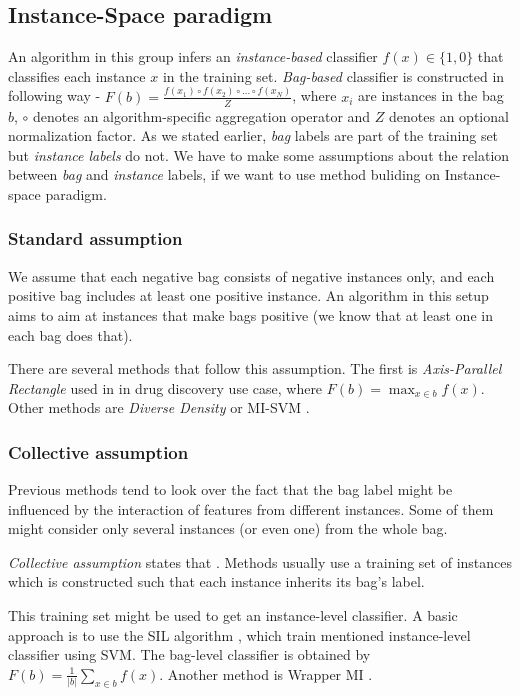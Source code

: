 \subsection{Instance-Space paradigm}
An algorithm in this group infers an \emph{instance-based} classifier $f(x) \in \{1,0\}$ that classifies each instance $x$ in the training set. \emph{Bag-based} classifier is constructed in following way - $F(b)=\frac{f(x_1)\circ f(x_2)\circ\dots\circ f(x_N)}{Z}$, where $x_i$ are instances in the bag $b$, $\circ$ denotes an algorithm-specific aggregation operator and $Z$ denotes an optional normalization factor. As we stated earlier, \emph{bag} labels are part of the training set but \emph{instance labels} do not. We have to make some assumptions about the relation between \emph{bag} and \emph{instance} labels, if we want to use method buliding on Instance-space paradigm.

\subsubsection{Standard assumption}
We assume that each negative bag consists of negative instances only, and each positive bag includes at least one positive instance. An algorithm in this setup aims to aim at instances that make bags positive (we know that at least one in each bag does that).

There are several methods that follow this assumption. The first is \emph{Axis-Parallel Rectangle} used in \cite{Dietterich1997} in drug discovery use case, where $F(b)=\max_{x\in b}f(x)$. Other methods are \emph{Diverse Density} \cite{Maron1998} or MI-SVM \cite{Andrews2003}.

\subsubsection{Collective assumption}
Previous methods tend to look over the fact that the bag label might be influenced by the interaction of features from different instances. Some of them might consider only several instances (or even one) from the whole bag.

\emph{Collective assumption} states that  \cite{Xu2003}. Methods usually use a training set of instances which is constructed such that each instance inherits its bag's label.

This training set might be used to get an instance-level classifier. A basic approach is to use the SIL algorithm \cite{Bunescu2007}, which train mentioned instance-level classifier using SVM. The bag-level classifier is obtained by $F(b)=\frac{1}{|b|}\sum_{x\in b}f(x)$. Another method is Wrapper MI \cite{Frank2003}.

